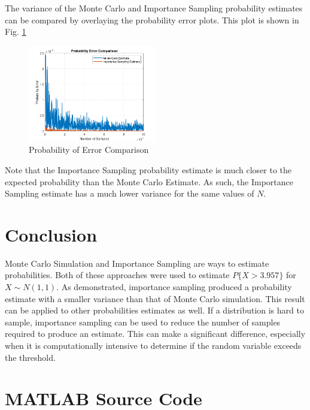 \documentclass[conference]{IEEEtran}
\begin{document}
The variance of the Monte Carlo and Importance Sampling probability estimates can be compared by overlaying the probability error plots. This plot is shown in Fig. \ref{Error Overlay}
\begin{figure}[H]
\centerline{\includegraphics[width=0.5\textwidth]{Error_Overlay.png}}
\caption{Probability of Error Comparison}
\label{Error Overlay}
\end{figure}
\noindent
Note that the Importance Sampling probability estimate is much closer to the expected probability than the Monte Carlo Estimate. As such, the Importance Sampling estimate has a much lower variance for the same values of $N$.
\section{Conclusion}
Monte Carlo Simulation and Importance Sampling are ways to estimate probabilities. Both of these approaches were used to estimate $P\{X > 3.957\}$ for $X \sim N(1,1)$. As demonstrated, importance sampling produced a probability estimate with a smaller variance than that of Monte Carlo simulation. This result can be applied to other probabilities estimates as well. If a distribution is hard to sample, importance sampling can be used to reduce the number of samples required to produce an estimate. This can make a significant difference, especially when it is computationally intensive to determine if the random variable exceeds the threshold.
\onecolumn
\pagebreak
\appendices
\section{MATLAB Source Code}
\label{matlab_code}
\lstset{style=Matlab-editor}

\raggedbottom
\end{document}
